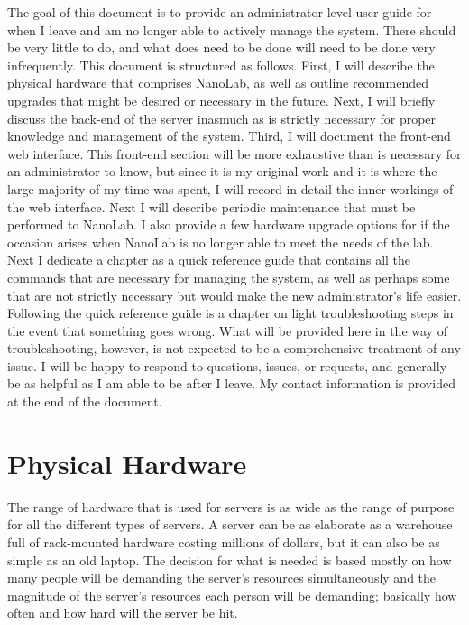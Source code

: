 \documentclass[titlepage]{article}
\begin{document}
    The goal of this document is to provide an administrator-level user guide for when I leave and am no longer able to actively manage the system. There should be very little to do, and what does need to be done will need to be done very infrequently. This document is structured as follows. First, I will describe the physical hardware that comprises NanoLab, as well as outline recommended upgrades that might be desired or necessary in the future. Next, I will briefly discuss the back-end of the server inasmuch as is strictly necessary for proper knowledge and management of the system. Third, I will document the front-end web interface. This front-end section will be more exhaustive than is necessary for an administrator to know, but since it is my original work and it is where the large majority of my time was spent, I will record in detail the inner workings of the web interface. Next I will describe periodic maintenance that must be performed to NanoLab. I also provide a few hardware upgrade options for if the occasion arises when NanoLab is no longer able to meet the needs of the lab. Next I dedicate a chapter as a quick reference guide that contains all the commands that are necessary for managing the system, as well as perhaps some that are not strictly necessary but would make the new administrator's life easier. Following the quick reference guide is a chapter on light troubleshooting steps in the event that something goes wrong. What will be provided here in the way of troubleshooting, however, is not expected to be a comprehensive treatment of any issue. I will be happy to respond to questions, issues, or requests, and generally be as helpful as I am able to be after I leave. My contact information is provided at the end of the document.
    
\section{Physical Hardware}

    The range of hardware that is used for servers is as wide as the range of purpose for all the different types of servers. A server can be as elaborate as a warehouse full of rack-mounted hardware costing millions of dollars, but it can also be as simple as an old laptop. The decision for what is needed is based mostly on how many people will be demanding the server's resources simultaneously and the magnitude of the server's resources each person will be demanding; basically how often and how hard will the server be hit. 
    
\end{document}
